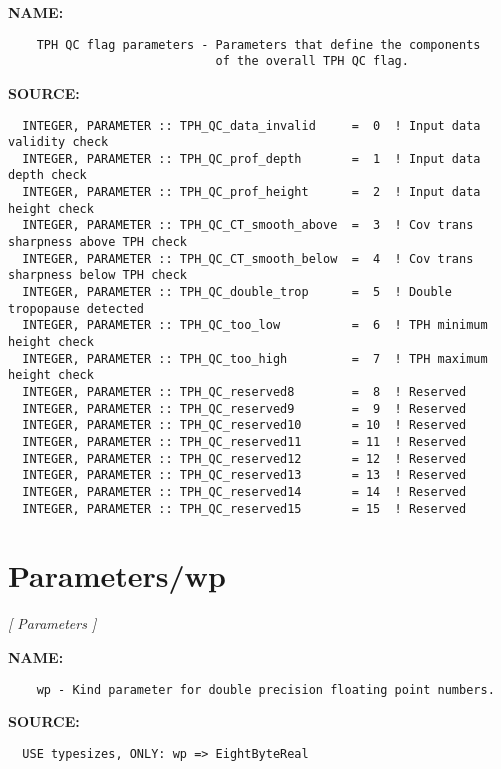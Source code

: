 \label{ch:robo51}
\label{ch:Parameters_TPH_QC_flag}
\textbf{NAME:}\hspace{0.08in}\begin{Verbatim}
    TPH QC flag parameters - Parameters that define the components 
                             of the overall TPH QC flag.
\end{Verbatim}
\textbf{SOURCE:}\hspace{0.08in}\begin{Verbatim}
  INTEGER, PARAMETER :: TPH_QC_data_invalid     =  0  ! Input data validity check
  INTEGER, PARAMETER :: TPH_QC_prof_depth       =  1  ! Input data depth check
  INTEGER, PARAMETER :: TPH_QC_prof_height      =  2  ! Input data height check
  INTEGER, PARAMETER :: TPH_QC_CT_smooth_above  =  3  ! Cov trans sharpness above TPH check
  INTEGER, PARAMETER :: TPH_QC_CT_smooth_below  =  4  ! Cov trans sharpness below TPH check
  INTEGER, PARAMETER :: TPH_QC_double_trop      =  5  ! Double tropopause detected
  INTEGER, PARAMETER :: TPH_QC_too_low          =  6  ! TPH minimum height check
  INTEGER, PARAMETER :: TPH_QC_too_high         =  7  ! TPH maximum height check
  INTEGER, PARAMETER :: TPH_QC_reserved8        =  8  ! Reserved
  INTEGER, PARAMETER :: TPH_QC_reserved9        =  9  ! Reserved
  INTEGER, PARAMETER :: TPH_QC_reserved10       = 10  ! Reserved
  INTEGER, PARAMETER :: TPH_QC_reserved11       = 11  ! Reserved
  INTEGER, PARAMETER :: TPH_QC_reserved12       = 12  ! Reserved
  INTEGER, PARAMETER :: TPH_QC_reserved13       = 13  ! Reserved
  INTEGER, PARAMETER :: TPH_QC_reserved14       = 14  ! Reserved
  INTEGER, PARAMETER :: TPH_QC_reserved15       = 15  ! Reserved
\end{Verbatim}
\section{Parameters/wp}
\textsl{[ Parameters ]}

\label{ch:robo52}
\label{ch:Parameters_wp}
\textbf{NAME:}\hspace{0.08in}\begin{Verbatim}
    wp - Kind parameter for double precision floating point numbers.
\end{Verbatim}
\textbf{SOURCE:}\hspace{0.08in}\begin{Verbatim}
  USE typesizes, ONLY: wp => EightByteReal
\end{Verbatim}
